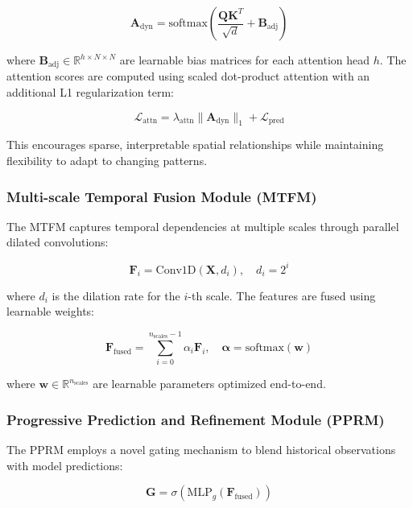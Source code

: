 \documentclass[lettersize, journal]{IEEEtran}
\begin{document}
\begin{equation}
\mathbf{A}_{\text{dyn}} = \text{softmax}\left(\frac{\mathbf{Q}\mathbf{K}^T}{\sqrt{d}} + \mathbf{B}_{\text{adj}}\right)
\end{equation}

where $\mathbf{B}_{\text{adj}} \in \mathbb{R}^{h \times N \times N}$ are learnable bias matrices for each attention head $h$. The attention scores are computed using scaled dot-product attention with an additional L1 regularization term:

\begin{equation}
\mathcal{L}_{\text{attn}} = \lambda_{\text{attn}}\|\mathbf{A}_{\text{dyn}}\|_1 + \mathcal{L}_{\text{pred}}
\end{equation}

This encourages sparse, interpretable spatial relationships while maintaining flexibility to adapt to changing patterns.

\subsubsection{Multi-scale Temporal Fusion Module (MTFM)}
The MTFM captures temporal dependencies at multiple scales through parallel dilated convolutions:

\begin{equation}
\mathbf{F}_i = \text{Conv1D}(\mathbf{X}, d_i), \quad d_i = 2^i
\end{equation}

where $d_i$ is the dilation rate for the $i$-th scale. The features are fused using learnable weights:

\begin{equation}
\mathbf{F}_{\text{fused}} = \sum_{i=0}^{n_{\text{scales}}-1} \alpha_i \mathbf{F}_i, \quad \boldsymbol{\alpha} = \text{softmax}(\mathbf{w})
\end{equation}

where $\mathbf{w} \in \mathbb{R}^{n_{\text{scales}}}$ are learnable parameters optimized end-to-end.

\subsubsection{Progressive Prediction and Refinement Module (PPRM)}
The PPRM employs a novel gating mechanism to blend historical observations with model predictions:

\begin{equation}
\mathbf{G} = \sigma(\text{MLP}_g(\mathbf{F}_{\text{fused}}))
\end{equation}
\end{document}
